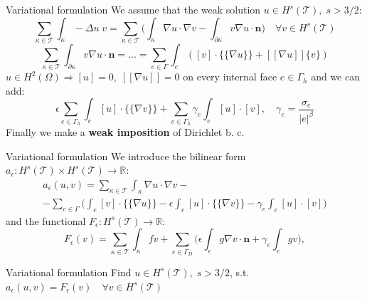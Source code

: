 \documentclass{beamer}
\begin{document}
\begin{frame}{Variational formulation}
	We assume that the weak solution $u \in H^s(\mathcal{T}), \; s>3/2$:
	\begin{equation*}
		\sum_{\kappa \in \mathcal{T}} \int_\kappa -\Delta u \; v
		= \sum_{\kappa \in \mathcal{T}} \bigg( \int_\kappa \nabla u \cdot
		\nabla v
		- \int_{\partial \kappa} v \nabla u \cdot \mathbf{n} \bigg) \quad
		\forall v
		\in H^s(\mathcal{T})
	\end{equation*}
	\begin{equation*}
			\sum_{\kappa \in \mathcal{T}} \int_{\partial \kappa} v \nabla u
			\cdot \mathbf{n} = ... = \sum_{e \in \Gamma} \int_e ([v]
			\cdot
			\{\!\!\{
			\nabla u \}\!\!\}
			+ [\![
			\nabla u ]\!] \{v\} )
	\end{equation*}
	\pause
	$u \in H^2(\Omega) \Rightarrow [u] = 0, \; [\![\nabla u]\!] = 0 $ on every 
	internal face $e \in \Gamma_h$ and we can add:
	\begin{equation*}
		\epsilon \sum_{e \in \Gamma_h} \int_e [u] \cdot \{\!\!\{ \nabla v
		\}\!\!\} + \sum_{e \in \Gamma_h} \gamma_e \int_e [u] \cdot [v], \quad
		\gamma_e =
		\frac{\sigma_e}{|e|^\beta}
	\end{equation*}
	Finally we make a \textbf{weak imposition} of Dirichlet b. c.
\end{frame}
\begin{frame}{Variational formulation}
	We introduce the bilinear form
	$a_\epsilon: H^s(\mathcal{T}) \times H^s(\mathcal{T}) \rightarrow
	\mathbb{R}$:
	\begin{multline*}
	a_\epsilon(u, v) = \sum_{\kappa \in \mathcal{T}} \int_\kappa \nabla u \cdot
	\nabla v -\\
	-\sum_{e \in \Gamma} \bigg( \int_e [v] \cdot \{\!\!\{ \nabla u \}\!\!\}
	-\epsilon \int_e [u] \cdot \{\!\!\{ \nabla v \}\!\!\}
	- \gamma_e \int_e [u]\cdot[v] \bigg)
	\end{multline*}
	and the functional $F_\epsilon: H^s(\mathcal{T}) \rightarrow \mathbb{R}$:
	\begin{equation*}
	F_\epsilon(v) = \sum_{\kappa \in \mathcal{T}} \int_\kappa fv
	+ \sum_{e \in \Gamma_D} \bigg( \epsilon \int_e g \nabla v \cdot \mathbf{n}
	+ \gamma_e \int_e gv \bigg),
	\end{equation*}
	\begin{block}{Variational formulation}
	Find $u \in H^s(\mathcal{T}), \; s>3/2$, s.t. $a_\epsilon(u, v) =
	F_\epsilon(v) \quad \forall v \in H^s(\mathcal{T})$
	\end{block}

\end{frame}
\end{document}

